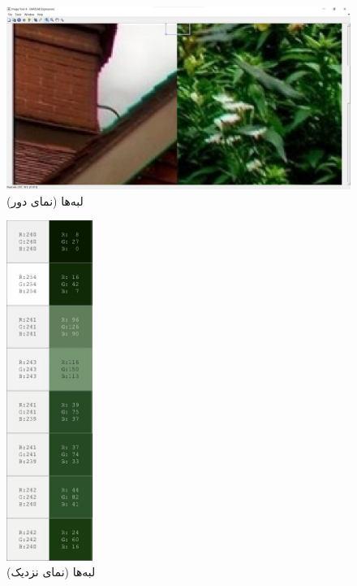 \documentclass{article}
\begin{document}
\begin{figure}[H]
    \centering
    \includegraphics[width=1.0\textwidth]{figures/3p3p.jpg}
    \caption
	{
لبه‌ها (نمای دور)
	}
    \label{fig:fig1}
\end{figure}
\begin{figure}[H]
    \centering
    \includegraphics[width=0.25\textwidth]{figures/3p3.jpg}
    \caption
	{
لبه‌ها (نمای نزدیک)
	}
    \label{fig:fig1}
\end{figure}
\end{document}

